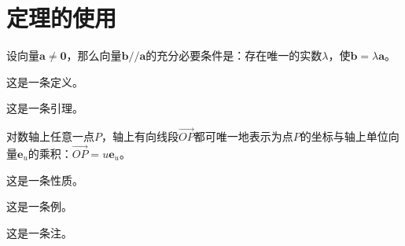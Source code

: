 \section{定理的使用}
\begin{theorem}
  设向量$\boldsymbol a\neq\boldsymbol 0$，那么向量$\boldsymbol b//\boldsymbol a$的充分必要条件是：存在唯一的实数$\lambda$，使$\boldsymbol b=\lambda \boldsymbol a$。
\end{theorem}
\begin{definition}
  这是一条定义。
\end{definition}
\begin{lemma}
  这是一条引理。
\end{lemma}
\begin{corollary}
  对数轴上任意一点$P$，轴上有向线段$\vec {OP}$都可唯一地表示为点$P$的坐标与轴上单位向量$\boldsymbol e_u$的乘积：$\vec {OP}=u \boldsymbol e_u$。
\end{corollary}
\begin{proposition}
  这是一条性质。
\end{proposition}
\begin{example}
  这是一条例。
\end{example}
\begin{remark}
  这是一条注。
\end{remark}